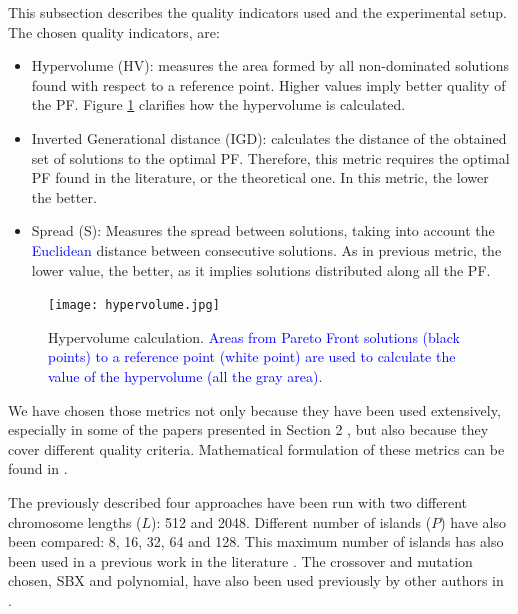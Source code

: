 \documentclass[preprint]{elsarticle}
\begin{document}
This subsection describes the quality indicators used and the experimental setup. The chosen quality indicators, are:

\begin{itemize}
\item Hypervolume (HV): measures the area formed by all non-dominated solutions found with respect to a reference point. Higher values imply better quality of the PF. Figure \ref{fig:hypervolume} clarifies how the hypervolume is calculated.
\item Inverted Generational distance (IGD): calculates the distance of the obtained set of solutions to the optimal PF. Therefore, this metric requires the optimal PF found in the literature, or the theoretical one. In this metric, the lower the better. %
\item Spread (S): Measures the spread between solutions, taking into account the \textcolor{blue}{Euclidean} distance between consecutive solutions. As in previous metric, the lower value, the better, as it implies solutions distributed along all the PF.
\end{itemize}

\begin{figure}
\centering
\texttt{[image: hypervolume.jpg]}
\caption{Hypervolume calculation. \textcolor{blue}{Areas from Pareto Front solutions (black points) to a reference point (white point) are used to calculate the value of the hypervolume (all the gray area)}.}
\label{fig:hypervolume}
\end{figure}


We have chosen those metrics not only because they have been used extensively, especially in some of the papers presented in Section 2 \cite{Dorronsoro13superlinear,Durillo08masterslave,Hiroyasu07discussion,Wang09parallel,Martens13asynchronous}, but also because they cover different quality criteria. Mathematical formulation of these metrics can be found in \cite{Dorronsoro13superlinear}.



The previously described four approaches have been run with two
different chromosome lengths ($L$): 512 and 2048. Different number of
islands ($P$) have also been compared: 8, 16, 32, 64 and 128. This
maximum number of islands has also been  used in a previous work in the
literature \cite{Martens13asynchronous}. The crossover and mutation
chosen, SBX and polynomial, have also been  used previously by other
authors in \cite{Durillo08masterslave,CaoZLL17}.  %
\end{document}
